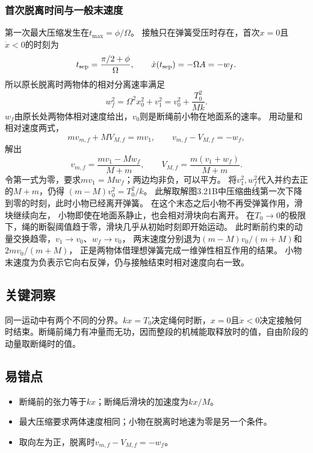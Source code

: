 \documentclass[UTF8,fontset=fandol,a4paper,11pt]{ctexart}
\begin{document}
\subsubsection*{首次脱离时间与一般末速度}
第一次最大压缩发生在$t_{\max}=\phi/\Omega$。
接触只在弹簧受压时存在，首次$x=0$且$\dot x<0$的时刻为
\[
t_{\rm sep}=\frac{\pi/2+\phi}{\Omega},\qquad
\dot x(t_{\rm sep})=-\Omega A=-w_f.
\]
所以原长脱离时两物体的相对分离速率满足
\[
w_f^2=\Omega^2x_0^2+v_1^2
=v_0^2+\frac{T_0^2}{Mk}.
\]
$w_f$由原长处两物体相对速度给出，$v_0$则是断绳前小物在地面系的速率。
用动量和相对速度两式，
\[
mv_{m,f}+MV_{M,f}=mv_1,
\qquad v_{m,f}-V_{M,f}=-w_f,
\]
解出
\[
v_{m,f}=\frac{mv_1-Mw_f}{M+m},\qquad
V_{M,f}=\frac{m(v_1+w_f)}{M+m}.
\]
令第一式为零，要求$mv_1=Mw_f$；两边均非负，可以平方。
将$v_1^2,w_f^2$代入并约去正的$M+m$，仍得
$(m-M)v_0^2=T_0^2/k$。
此解取解图3.21B中压缩曲线第一次下降到零的时刻，此时小物已经离开弹簧。
在这个末态之后小物不再受弹簧作用，滑块继续向左，
小物即使在地面系静止，也会相对滑块向右离开。
在$T_0\to0$的极限下，绳的断裂阈值趋于零，滑块几乎从初始时刻即开始运动。
此时断前约束的动量交换趋零，$v_1\to v_0$、$w_f\to v_0$，
两末速度分别退为$(m-M)v_0/(m+M)$和$2mv_0/(m+M)$，
正是两物体借理想弹簧完成一维弹性相互作用的结果。
小物末速度为负表示它向右反弹，仍与接触结束时相对速度向右一致。





\subsection*{关键洞察}

同一运动中有两个不同的分界。$kx=T_0$决定绳何时断，$x=0$且$\dot x<0$决定接触何时结束。断绳前绳力有冲量而无功，因而整段的机械能取释放时的值，自由阶段的动量取断绳时的值。



\subsection*{易错点}

\begin{itemize}
\item 断绳前的张力等于$kx$；断绳后滑块的加速度为$kx/M$。
\item 最大压缩要求两体速度相同；小物在脱离时地速为零是另一个条件。
\item 取向左为正，脱离时$v_{m,f}-V_{M,f}=-w_f$。
\end{itemize}
\end{document}
